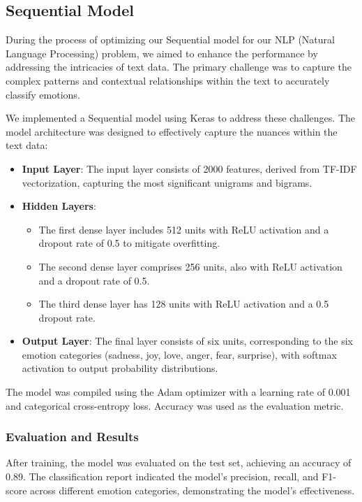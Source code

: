 \subsection{Sequential Model}

During the process of optimizing our Sequential model for our NLP (Natural Language Processing) problem, we aimed to enhance the performance by addressing the intricacies of text data. The primary challenge was to capture the complex patterns and contextual relationships within the text to accurately classify emotions. \autocite{sequential-model}

We implemented a Sequential model using Keras to address these challenges. The model architecture was designed to effectively capture the nuances within the text data:

\begin{itemize}
    \item \textbf{Input Layer}: The input layer consists of 2000 features, derived from TF-IDF vectorization, capturing the most significant unigrams and bigrams.
    \item \textbf{Hidden Layers}:
    \begin{itemize}
        \item The first dense layer includes 512 units with ReLU activation and a dropout rate of 0.5 to mitigate overfitting.
        \item The second dense layer comprises 256 units, also with ReLU activation and a dropout rate of 0.5.
        \item The third dense layer has 128 units with ReLU activation and a 0.5 dropout rate.
    \end{itemize}
    \item \textbf{Output Layer}: The final layer consists of six units, corresponding to the six emotion categories (sadness, joy, love, anger, fear, surprise), with softmax activation to output probability distributions.
\end{itemize}

The model was compiled using the Adam optimizer with a learning rate of 0.001 and categorical cross-entropy loss. Accuracy was used as the evaluation metric.


\subsubsection{Evaluation and Results}

After training, the model was evaluated on the test set, achieving an accuracy of 0.89. The classification report indicated the model's precision, recall, and F1-score across different emotion categories, demonstrating the model's effectiveness.

